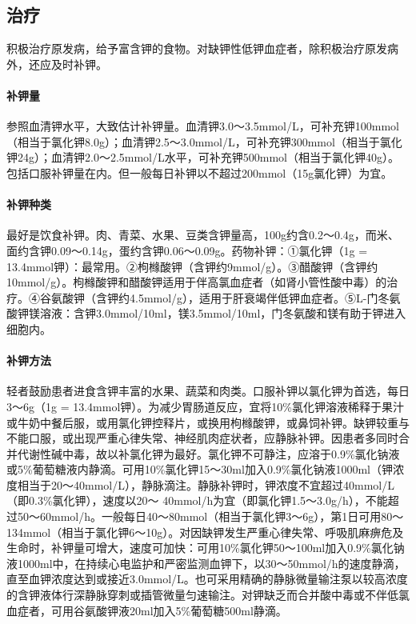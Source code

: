 \subsection{治疗}

积极治疗原发病，给予富含钾的食物。对缺钾性低钾血症者，除积极治疗原发病外，还应及时补钾。

\paragraph{补钾量}

参照血清钾水平，大致估计补钾量。血清钾3.0～3.5mmol/L，可补充钾100mmol（相当于氯化钾8.0g）；血清钾2.5～3.0mmol/L，可补充钾300mmol（相当于氯化钾24g）；血清钾2.0～2.5mmol/L水平，可补充钾500mmol（相当于氯化钾40g）。包括口服补钾量在内。但一般每日补钾以不超过200mmol（15g氯化钾）为宜。

\paragraph{补钾种类}

最好是饮食补钾。肉、青菜、水果、豆类含钾量高，100g约含0.2～0.4g，而米、面约含钾0.09～0.14g，蛋约含钾0.06～0.09g。药物补钾：①氯化钾（1g
=
13.4mmol钾）：最常用。②枸橼酸钾（含钾约9mmol/g）。③醋酸钾（含钾约10mmol/g）。枸橼酸钾和醋酸钾适用于伴高氯血症者（如肾小管性酸中毒）的治疗。④谷氨酸钾（含钾约4.5mmol/g），适用于肝衰竭伴低钾血症者。⑤L-门冬氨酸钾镁溶液：含钾3.0mmol/10ml，镁3.5mmol/10ml，门冬氨酸和镁有助于钾进入细胞内。

\paragraph{补钾方法}

轻者鼓励患者进食含钾丰富的水果、蔬菜和肉类。口服补钾以氯化钾为首选，每日3～6g（1g
=
13.4mmol钾）。为减少胃肠道反应，宜将10\%氯化钾溶液稀释于果汁或牛奶中餐后服，或用氯化钾控释片，或换用枸橼酸钾，或鼻饲补钾。缺钾较重与不能口服，或出现严重心律失常、神经肌肉症状者，应静脉补钾。因患者多同时合并代谢性碱中毒，故以补氯化钾为最好。氯化钾不可静注，应溶于0.9\%氯化钠液或5\%葡萄糖液内静滴。可用10\%氯化钾15～30ml加入0.9\%氯化钠液1000ml（钾浓度相当于20～40mmol/L），静脉滴注。静脉补钾时，钾浓度不宜超过40mmol/L（即0.3\%氯化钾），速度以20～
40mmol/h为宜（即氯化钾1.5～3.0g/h），不能超过50～60mmol/h。一般每日40～80mmol（相当于氯化钾3～6g），第1日可用80～134mmol（相当于氯化钾6～10g）。对因缺钾发生严重心律失常、呼吸肌麻痹危及生命时，补钾量可增大，速度可加快：可用10\%氯化钾50～100ml加入0.9\%氯化钠液1000ml中，在持续心电监护和严密监测血钾下，以30～50mmol/h的速度静滴，直至血钾浓度达到或接近3.0mmol/L。也可采用精确的静脉微量输注泵以较高浓度的含钾液体行深静脉穿刺或插管微量匀速输注。对钾缺乏而合并酸中毒或不伴低氯血症者，可用谷氨酸钾液20ml加入5\%葡萄糖500ml静滴。


